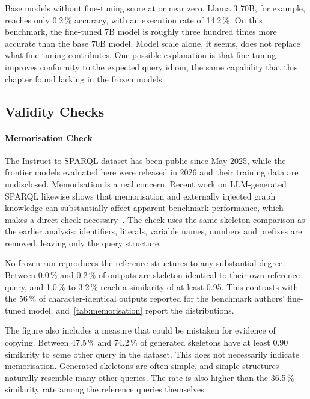 Base models without fine-tuning score at or near zero.
Llama 3 70B, for example, reaches only 0.2\,\% accuracy, with an execution rate of 14.2\,\%.
On this benchmark, the fine-tuned 7B model is roughly three hundred times more accurate than the base 70B model.
Model scale alone, it seems, does not replace what fine-tuning contributes.
One possible explanation is that fine-tuning improves conformity to the expected query idiom, the same capability that this chapter found lacking in the frozen models.

\subsection{Validity Checks}

\label{sec:res-validity}

\paragraph{Memorisation Check}



The Instruct-to-SPARQL dataset has been public since May 2025, while the frontier models evaluated here were released in 2026 and their training data are undisclosed.
Memorisation is a real concern.
Recent work on LLM-generated SPARQL likewise shows that memorisation and externally injected graph knowledge can substantially affect apparent benchmark performance, which makes a direct check necessary~\citep{gashkov2025memorization}.
The check uses the same skeleton comparison as the earlier analysis: identifiers, literals, variable names, numbers and prefixes are removed, leaving only the query structure.

No frozen run reproduces the reference structures to any substantial degree.
Between 0.0\,\% and 0.2\,\% of outputs are skeleton-identical to their own reference query, and 1.0\,\% to 3.2\,\% reach a similarity of at least 0.95.
This contrasts with the 56\,\% of character-identical outputs reported for the benchmark authors' fine-tuned model.
 and~\cref{tab:memorisation} report the distributions.

The figure also includes a measure that could be mistaken for evidence of copying.
Between 47.5\,\% and 74.2\,\% of generated skeletons have at least 0.90 similarity to some other query in the dataset.
This does not necessarily indicate memorisation.
Generated skeletons are often simple, and simple structures naturally resemble many other queries.
The rate is also higher than the 36.5\,\% similarity rate among the reference queries themselves.

